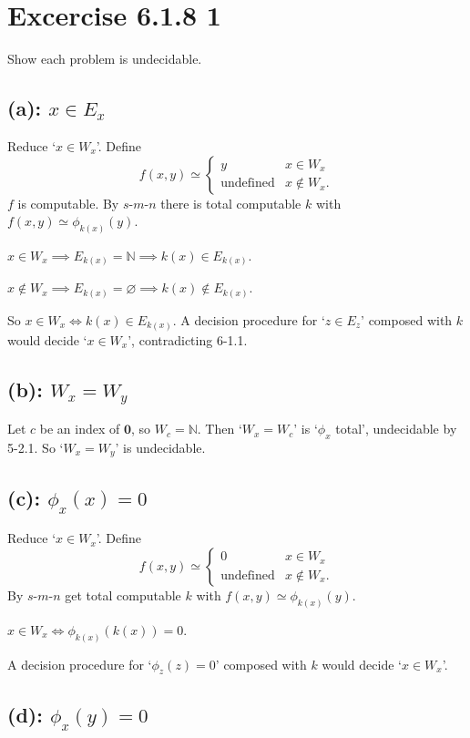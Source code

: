 \documentclass[fleqn]{article}
\begin{document}
\section*{Excercise 6.1.8 1}

Show each problem is undecidable.

\subsection*{(a): $x \in E_x$}

Reduce `$x \in W_x$'. Define
\[
f(x, y) \simeq
\begin{cases}
y & x \in W_x \\
\text{undefined} & x \notin W_x.
\end{cases}
\]
$f$ is computable. By $s$-$m$-$n$ there is total computable $k$ with $f(x, y) \simeq \phi_{k(x)}(y)$.

$x \in W_x \implies E_{k(x)} = \mathbb{N} \implies k(x) \in E_{k(x)}$.

$x \notin W_x \implies E_{k(x)} = \varnothing \implies k(x) \notin E_{k(x)}$.

So $x \in W_x \iff k(x) \in E_{k(x)}$. A decision procedure for `$z \in E_z$' composed with $k$ would decide `$x \in W_x$', contradicting 6-1.1.

\subsection*{(b): $W_x = W_y$}

Let $c$ be an index of $\mathbf{0}$, so $W_c = \mathbb{N}$. Then `$W_x = W_c$' is `$\phi_x$ total', undecidable by 5-2.1. So `$W_x = W_y$' is undecidable.

\subsection*{(c): $\phi_x(x) = 0$}

Reduce `$x \in W_x$'. Define
\[
f(x, y) \simeq
\begin{cases}
0 & x \in W_x \\
\text{undefined} & x \notin W_x.
\end{cases}
\]
By $s$-$m$-$n$ get total computable $k$ with $f(x, y) \simeq \phi_{k(x)}(y)$.

$x \in W_x \iff \phi_{k(x)}(k(x)) = 0$.

A decision procedure for `$\phi_z(z) = 0$' composed with $k$ would decide `$x \in W_x$'.

\subsection*{(d): $\phi_x(y) = 0$}
\end{document}
